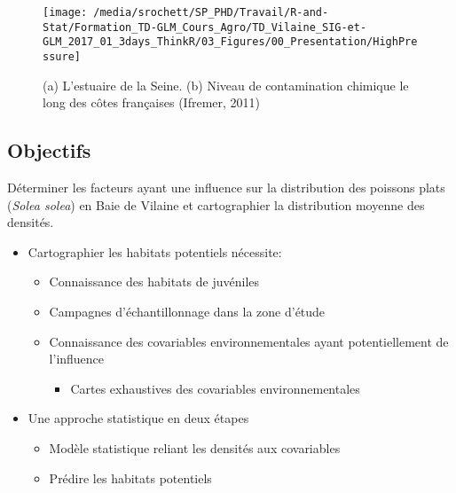 \documentclass[french,a4paper]{article}
\providecommand{\tightlist}{%
  \setlength{\itemsep}{0pt}\setlength{\parskip}{0pt}}
\begin{document}
\begin{figure}[!h]

{\centering \texttt{[image: /media/srochett/SP\_PHD/Travail/R-and-Stat/Formation\_TD-GLM\_Cours\_Agro/TD\_Vilaine\_SIG-et-GLM\_2017\_01\_3days\_ThinkR/03\_Figures/00\_Presentation/HighPressure]} 

}

\caption{(a) L'estuaire de la Seine. (b) Niveau de
contamination chimique le long des côtes françaises (Ifremer, 2011)}\label{fig:figHighPressure}
\end{figure}

\hypertarget{objectifs}{%
\subsection{Objectifs}\label{objectifs}}

Déterminer les facteurs ayant une influence sur la distribution des
poissons plats (\emph{Solea solea}) en Baie de Vilaine et cartographier
la distribution moyenne des densités.

\begin{itemize}
\tightlist
\item
  Cartographier les habitats potentiels nécessite:

  \begin{itemize}
  \tightlist
  \item
    Connaissance des habitats de juvéniles
  \item
    Campagnes d'échantillonnage dans la zone d'étude
  \item
    Connaissance des covariables environnementales ayant potentiellement
    de l'influence

    \begin{itemize}
    \tightlist
    \item
      Cartes exhaustives des covariables environnementales
    \end{itemize}
  \end{itemize}
\item
  Une approche statistique en deux étapes

  \begin{itemize}
  \tightlist
  \item
    Modèle statistique reliant les densités aux covariables
  \item
    Prédire les habitats potentiels
  \end{itemize}
\end{itemize}
\end{document}
